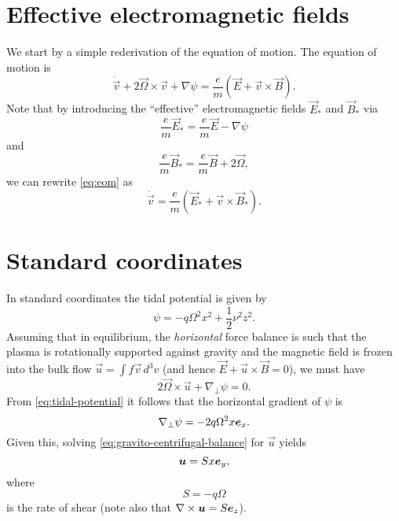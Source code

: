 \documentclass[aps,pre,notitlepage,amsmath,amssymb,amsfonts,nobibnotes,nofootinbib,superscriptaddress,onecolumn,a4paper,10pt]{revtex4-1}
\begin{document}
\section{Effective electromagnetic fields}
We start by a simple rederivation of the equation of motion.
The equation of motion is
\begin{equation}
  \label{eq:eom}
  \dot{\vec{v}} + 2\vec{\Omega}\times\vec{v} + \nabla\psi =
  \frac{e}{m}(\vec{E} + \vec{v}\times\vec{B}).
\end{equation}
Note that by introducing the ``effective'' electromagnetic fields
$\vec{E}_\ast$ and $\vec{B}_\ast$ via
\begin{equation}
  \frac{e}{m}\vec{E}_\ast = \frac{e}{m}\vec{E} - \nabla\psi
\end{equation}
and
\begin{equation}
  \frac{e}{m}\vec{B}_\ast = \frac{e}{m}\vec{B} + 2\vec{\Omega},
\end{equation}
we can rewrite \cref{eq:eom} as
\begin{equation}
  \dot{\vec{v}} =
  \frac{e}{m}(\vec{E}_\ast + \vec{v}\times\vec{B}_\ast).
\end{equation}

\section{Standard coordinates}
In standard coordinates the tidal potential is given by
\begin{equation}
  \label{eq:tidal-potential}
  \psi = -q\Omega^2 x^2 + \frac{1}{2}\nu^2 z^2.
\end{equation}
Assuming that in equilibrium, the \emph{horizontal} force balance is such that
the plasma is rotationally supported against gravity and the magnetic field is
frozen into the bulk flow $\vec{u}=\int\!f\vec{v}\,d^3v$ (and hence
$\vec{E}+\vec{u}\times\vec{B}=0$), we must have
\begin{equation}
  \label{eq:gravito-centrifugal-balance}
  2\vec{\Omega}\times\vec{u} + \nabla_\perp\psi = 0.
\end{equation}
From \cref{eq:tidal-potential} it follows that the horizontal gradient of
$\psi$ is
\begin{equation}
   \nabla_\perp\psi = -2q\Omega^2 x\bm{e}_x.
\end{equation}
Given this, solving \cref{eq:gravito-centrifugal-balance} for $\vec{u}$ yields
\begin{equation}
  \label{eq:common-shear-flow}
  \bm{u} = Sx\bm{e}_y,
\end{equation}
where
\begin{equation}
  S = -q\Omega
\end{equation}
is the rate of shear (note also that $\nabla\times\bm{u}=S\bm{e}_z$).
\end{document}
